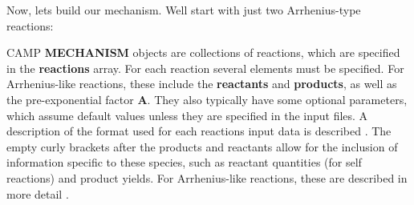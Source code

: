 Now, let\textquotesingle{}s build our mechanism. We\textquotesingle{}ll start with just two Arrhenius-\/type reactions\+: 
\begin{DoxyCode}{0}
\DoxyCodeLine{\{}
\DoxyCodeLine{\ \ "{}reactions"{}\ :\ [}
\DoxyCodeLine{\ \ \ \ \{}
\DoxyCodeLine{\ \ \ \ \ \ \},}
\DoxyCodeLine{\ \ \ \ \ \ \},}
\DoxyCodeLine{\ \ \ \ \},}
\DoxyCodeLine{\ \ \ \ \{}
\DoxyCodeLine{\ \ \ \ \ \ \},}
\DoxyCodeLine{\ \ \ \ \ \},}
\DoxyCodeLine{\ \ \ \ \},}
\DoxyCodeLine{\ \ \ \ \{}
\DoxyCodeLine{\ \ \ \ \ \ \},}
\DoxyCodeLine{\ \ \ \ \ \ \},}
\DoxyCodeLine{\ \ \ \ \}}
\DoxyCodeLine{\ \ ]}
\DoxyCodeLine{\}}

\end{DoxyCode}
 CAMP {\bfseries{MECHANISM}} objects are collections of reactions, which are specified in the {\bfseries{reactions}} array. For each reaction several elements must be specified. For Arrhenius-\/like reactions, these include the {\bfseries{reactants}} and {\bfseries{products}}, as well as the pre-\/exponential factor {\bfseries{A}}. They also typically have some optional parameters, which assume default values unless they are specified in the input files. A description of the format used for each reaction\textquotesingle{}s input data is described . The empty curly brackets after the products and reactants allow for the inclusion of information specific to these species, such as reactant quantities (for self reactions) and product yields. For Arrhenius-\/like reactions, these are described in more detail .


